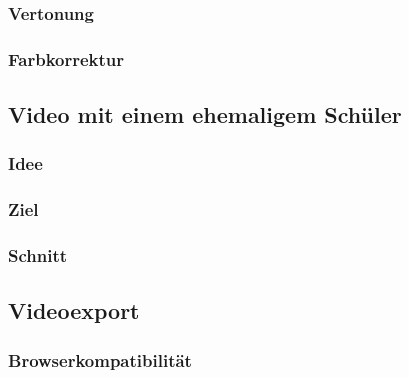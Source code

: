 \subsubsection{Vertonung}
\subsubsection{Farbkorrektur}
\subsection{Video mit einem ehemaligem Schüler}
\subsubsection{Idee}
\subsubsection{Ziel}
\subsubsection{Schnitt}


\subsection{Videoexport}
\subsubsection{Browserkompatibilität}